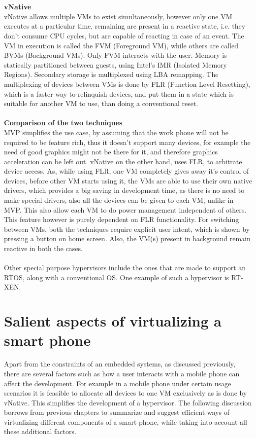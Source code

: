 \documentclass[seminar,twoside]{iitbreport}
\begin{document}
  \\\\
  \textbf{vNative}
  \\
  vNative allows multiple VMs to exist simultaneously, however only one VM executes at a particular time, remaining are present in a reactive state, i.e. they 
  don't consume CPU cycles, but are capable of reacting in case of an event. The VM in execution is called the FVM (Foreground VM), while others are called
  BVMs (Background VMs). Only FVM interacts with the user. Memory is statically partitioned between guests, using Intel's IMR (Isolated Memory Regions). Secondary storage is
  multiplexed using LBA remapping. 
  The multiplexing of devices between VMs is done by FLR (Function Level Resetting), which is a faster way to relinquish devices, and put them in a state which
  is suitable for another VM to use, than doing a conventional reset.
  \\\\
  \textbf{Comparison of the two techniques}
  \\
  MVP simplifies the use case, by assuming that the work phone will not be required to be feature rich, thus it doesn't support many devices, for example the need of 
  good graphics might not be there for it, and therefore graphics acceleration can be left out.
  vNative on the other hand, uses FLR, to arbitrate device access. As, while using FLR, one VM completely gives away it's control of devices, before other
  VM starts using it, the VMs are able to use their own native drivers, which provides a big saving in development time, as there is no need to make special
  drivers, also all the devices can be given to each VM, unlike in MVP. This also allow each VM to do power management independent of others. This feature however is purely dependent on FLR functionality.
  For switching between VMs, both the techniques require explicit user intent, which is shown by pressing a button on home screen. Also, the VM(s) present in 
  background remain reactive in both the cases.
  \\\\
  Other special purpose hypervisors include the ones that are made to support an RTOS, along with a conventional OS. One example of such a hypervisor is RT-XEN\cite{6064510}.
 \newpage
 \section{Salient aspects of virtualizing a smart phone}
 Apart from the constraints of an embedded systems, as discussed previously, there are several factors such as how a user interacts with a mobile phone can affect the development.
 For example in a mobile phone under certain usage scenarios it is feasible to allocate all devices to one VM exclusively as is done by vNative\cite{7006388}. This
 simplifies the development of a hypervisor. The following discussion borrows from previous chapters to summarize and suggest efficient ways of virtualizing different components of a smart phone,
 while taking into account all these additional factors.
 
\end{document}
